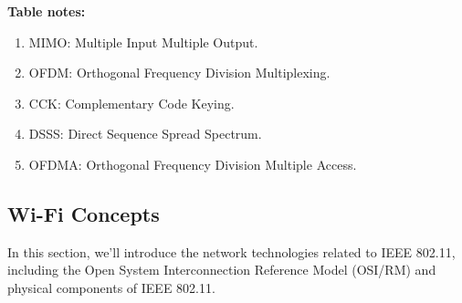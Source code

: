 \documentclass[a4paper,12pt]{book}
\begin{document}
\textbf{Table notes:}

\begin{enumerate}[label=$^\arabic*$]
    \item MIMO: Multiple Input Multiple Output.
    \item OFDM: Orthogonal Frequency Division Multiplexing.
    \item CCK: Complementary Code Keying.
    \item DSSS: Direct Sequence Spread Spectrum.
    \item OFDMA: Orthogonal Frequency Division Multiple Access.
\end{enumerate}

\subsection{Wi-Fi Concepts}
In this section, we’ll introduce the network technologies related to IEEE 802.11, including the Open System Interconnection Reference Model (OSI/RM) and physical components of IEEE 802.11.
\end{document}
